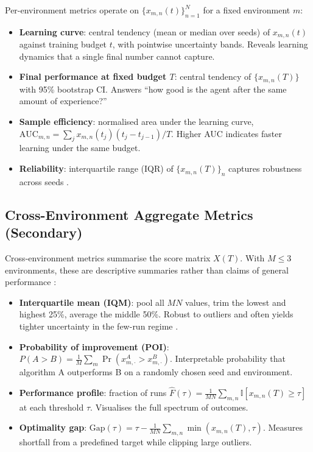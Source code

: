 Per-environment metrics operate on $\{x_{m,n}(t)\}_{n=1}^N$ for a fixed environment $m$:

\begin{itemize}
\item \textbf{Learning curve}: central tendency (mean or median over seeds) of $x_{m,n}(t)$ against training budget $t$, with pointwise uncertainty bands. Reveals learning dynamics that a single final number cannot capture.
\item \textbf{Final performance at fixed budget $T$}: central tendency of $\{x_{m,n}(T)\}$ with 95\% bootstrap CI. Answers ``how good is the agent after the same amount of experience?'' \citep{agarwal2021precipice}
\item \textbf{Sample efficiency}: normalised area under the learning curve, $\mathrm{AUC}_{m,n}=\sum_{j}x_{m,n}(t_j)(t_j-t_{j-1})/T$. Higher AUC indicates faster learning under the same budget.
\item \textbf{Reliability}: interquartile range (IQR) of $\{x_{m,n}(T)\}_n$ captures robustness across seeds \citep{chan2020reliability}.
\end{itemize}

\subsection{Cross-Environment Aggregate Metrics (Secondary)}
\label{subsec:cross-env-metrics}

Cross-environment metrics summarise the score matrix $X(T)$. With $M \leq 3$ environments, these are descriptive summaries rather than claims of general performance \citep{agarwal2021precipice,patterson2024edrl}:

\begin{itemize}
\item \textbf{Interquartile mean (IQM)}: pool all $MN$ values, trim the lowest and highest 25\%, average the middle 50\%. Robust to outliers and often yields tighter uncertainty in the few-run regime \citep{agarwal2021precipice}.
\item \textbf{Probability of improvement (POI)}: $P(A>B) = \frac{1}{M}\sum_m \Pr(x^A_{m,\cdot}>x^B_{m,\cdot})$. Interpretable probability that algorithm A outperforms B on a randomly chosen seed and environment.
\item \textbf{Performance profile}: fraction of runs $\hat{F}(\tau) = \frac{1}{MN}\sum_{m,n}\mathbb{I}[x_{m,n}(T)\ge\tau]$ at each threshold $\tau$. Visualises the full spectrum of outcomes.
\item \textbf{Optimality gap}: $\mathrm{Gap}(\tau) = \tau - \frac{1}{MN}\sum_{m,n}\min(x_{m,n}(T),\tau)$. Measures shortfall from a predefined target while clipping large outliers.
\end{itemize}


